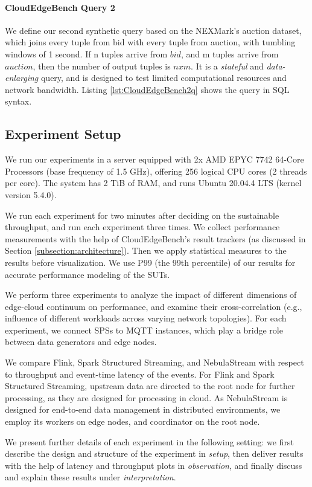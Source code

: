 \documentclass[runningheads]{llncs}
\begin{document}
\paragraph{CloudEdgeBench Query 2}
We define our second synthetic query based on the NEXMark's auction dataset, which joins every tuple from bid with every tuple from auction, with tumbling windows of 1 second.
If n tuples arrive from $bid$, and m tuples arrive from $auction$, then the number of output tuples is $nxm$.
It is a \textit{stateful} and \textit{data-enlarging} query, and is designed to test limited computational resources and network bandwidth.
Listing \ref{lst:CloudEdgeBench2q} shows the query in SQL syntax.

\subsection{Experiment Setup}
We run our experiments in a server equipped with 2x AMD EPYC 7742 64-Core Processors (base frequency of 1.5 GHz), offering 256 logical CPU cores (2 threads per core).
The system has 2 TiB of RAM, and runs Ubuntu 20.04.4 LTS (kernel version 5.4.0).

We run each experiment for two minutes after deciding on the sustainable throughput, and run each experiment three times.
We collect performance measurements with the help of CloudEdgeBench's result trackers (as discussed in Section \ref{subsection:architecture}).
Then we apply statistical measures to the results before visualization.
We use P99 (the 99th percentile) of our results for accurate performance modeling of the SUTs\cite{p99-latency}.

We perform three experiments to analyze the impact of different dimensions of edge-cloud continuum on performance, and examine their cross-correlation (e.g., influence of different workloads across varying network topologies).
For each experiment, we connect SPSs to MQTT instances, which play a bridge role between data generators and edge nodes.

We compare Flink, Spark Structured Streaming, and NebulaStream with respect to throughput and event-time latency of the events.
For Flink and Spark Structured Streaming, upstream data are directed to the root node for further processing, as they are designed for processing in cloud.
As NebulaStream is designed for end-to-end data management in distributed environments, we employ its workers on edge nodes, and coordinator on the root node.

We present further details of each experiment in the following setting: we first describe the design and structure of the experiment in \textit{setup}, then deliver results with the help of latency and throughput plots in \textit{observation}, and finally discuss and explain these results under \textit{interpretation}.
\end{document}

